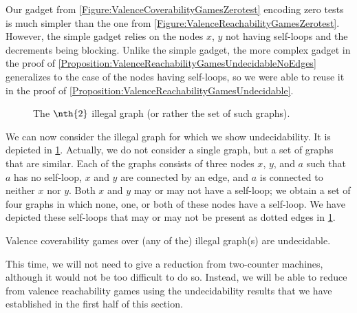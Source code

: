 \documentclass[../../diss.tex]{subfiles}
\begin{document}
Our gadget from \cref{Figure:ValenceCoverabilityGamesZerotest} encoding zero tests is much simpler than the one from \cref{Figure:ValenceReachabilityGamesZerotest}.
However, the simple gadget relies on the nodes $x$, $y$ not having self-loops and the decrements being blocking.
Unlike the simple gadget, the more complex gadget in the proof of \cref{Proposition:ValenceReachabilityGamesUndecidableNoEdges} generalizes to the case of the nodes having self-loops, so we were able to reuse it in the proof of \cref{Proposition:ValenceReachabilityGamesUndecidable}.

\begin{figure}[t]
    \centering%
    \caption{The $\nth{2}$ illegal graph (or rather the set of such graphs).}%
    \label{Figure:ValenceCoverabilityGamesUndecidableTwo}%
\end{figure}

We can now consider the  illegal graph for which we show undecidability.
It is depicted in \cref{Figure:ValenceCoverabilityGamesUndecidableTwo}.
Actually, we do not consider a single graph, but a set of graphs that are similar.
Each of the graphs consists of three nodes $x$, $y$, and $a$ such that $a$ has no self-loop, $x$ and $y$ are connected by an edge, and $a$ is connected to neither $x$ nor $y$.
Both $x$ and $y$ may or may not have a self-loop; we obtain a set of four graphs in which none, one, or both of these nodes have a self-loop.
We have depicted these self-loops that may or may not be present as dotted edges in \cref{Figure:ValenceCoverabilityGamesUndecidableTwo}.

\begin{lemma}%
\label{Lemma:ValenceCoverabilityGamesUndecidableTwo}%
    Valence coverability games over (any of the)  illegal graph(s) are undecidable.
\end{lemma}

This time, we will not need to give a reduction from two-counter machines, although it would not be too difficult to do so.
Instead, we will be able to reduce from valence reachability games using the undecidability results that we have established in the first half of this section.
\end{document}
